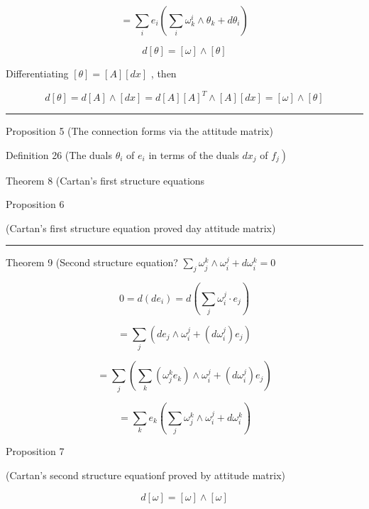 \documentclass[lang=cn,a4paper,11pt,openany,twoside]{elegantbook}
\newcommand{\HRule}{\begin{center}\rule{0.9\linewidth}{0.2mm}\end{center}}
\begin{document}
\[
= \mathop{\sum }\limits_{i}{e}_{i}\left( {\mathop{\sum }\limits_{i}{\omega }_{k}^{i} \land  {\theta }_{k} + d{\theta }_{i}}\right)
\]

\[
d\left\lbrack  \theta \right\rbrack   = \left\lbrack  \omega \right\rbrack   \land  \left\lbrack  \theta \right\rbrack
\]

Differentiating \(\left\lbrack  \theta \right\rbrack   = \left\lbrack  A\right\rbrack  \left\lbrack  {dx}\right\rbrack\) , then

\[
d\left\lbrack  \theta \right\rbrack   = d\left\lbrack  A\right\rbrack   \land  \left\lbrack  {dx}\right\rbrack   = d\left\lbrack  A\right\rbrack  {\left\lbrack  A\right\rbrack  }^{T} \land  \left\lbrack  A\right\rbrack  \left\lbrack  {dx}\right\rbrack   = \left\lbrack  \omega \right\rbrack   \land  \left\lbrack  \theta \right\rbrack
\]

\HRule

Proposition 5 (The connection forms via the attitude matrix)

Definition 26 (The duals \({\theta }_{i}\) of \({e}_{i}\) in terms of the duals \(d{x}_{j}\) of \(\left. {f}_{j}\right)\)

Theorem 8 (Cartan's first structure equations

Proposition 6

(Cartan's first structure equation proved day attitude matrix)

\HRule

Theorem 9 (Second structure equation? \(\mathop{\sum }\limits_{j}{\omega }_{j}^{k} \land  {\omega }_{i}^{j} + d{\omega }_{i}^{k} = 0\)

\[
0 = d\left( {d{e}_{i}}\right)  = d\left( {\mathop{\sum }\limits_{j}{\omega }_{i}^{j} \cdot  {e}_{j}}\right)
\]

\[
= \mathop{\sum }\limits_{j}\left( {d{e}_{j} \land  {\omega }_{i}^{j} + \left( {d{\omega }_{i}^{j}}\right) {e}_{j}}\right)
\]

\[
= \mathop{\sum }\limits_{j}\left( {\mathop{\sum }\limits_{k}\left( {{\omega }_{j}^{k}{e}_{k}}\right)  \land  {\omega }_{i}^{j} + \left( {d{\omega }_{i}^{j}}\right) {e}_{j}}\right)
\]

\[
= \mathop{\sum }\limits_{k}{e}_{k}\left( {\mathop{\sum }\limits_{j}{\omega }_{j}^{k} \land  {\omega }_{i}^{j} + d{\omega }_{i}^{k}}\right)
\]

Proposition 7

(Cartan's second structure equationf proved by attitude matrix)

\[
d\left\lbrack  \omega \right\rbrack   = \left\lbrack  \omega \right\rbrack   \land  \left\lbrack  \omega \right\rbrack
\]
\end{document}
